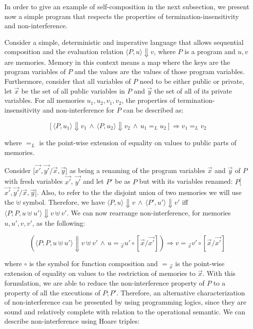 In order to give an example of self-composition in the next subsection, we present now a simple program that respects the properties of termination-insensitivity and non-interference.

Consider a simple, deterministic and imperative language that allows sequential composition and the evaluation relation \(\langle P, u\rangle \Downarrow v\), where \(P\) is a program and \(u,v\) are memories.
Memory in this context means a map where the keys are the program variables of \(P\) and the values are the values of those program variables.
Furthermore, consider that all variables of \(P\) need to be either public or private, let \(\overrightarrow{x}\) be the set of all public variables in \(P\) and \(\overrightarrow{y}\) the set of all of its private variables.
For all memories \(u_1,u_2,v_1,v_2\), the properties of termination-insensitivity and non-interference for \(P\) can be described as:

\[ [\langle P, u_1\rangle \Downarrow v_1 \, \land \, \langle P, u_2\rangle \Downarrow v_2 \, \land \, u_1 {=}_{L} u_2] \Rightarrow v_1 {=}_{L} v_2 \]

where ${=}_{L}$ is the point-wise extension of equality on values to public parts of memories.

Consider [\(\overrightarrow{x'}, \overrightarrow{y'} / \overrightarrow{x}, \overrightarrow{y}\)] as being a renaming of the program variables \(\overrightarrow{x}\) and \(\overrightarrow{y}\) of \(P\) with fresh variables \(\overrightarrow{x'}\), \(\overrightarrow{y'}\) and let \(P'\) be as \(P\) but with its variables renamed: \(P\)[\(\overrightarrow{x'}, \overrightarrow{y'} / \overrightarrow{x}, \overrightarrow{y}\)].
Also, to refer to the the disjoint union of two memories we will use the $\uplus$ symbol.
Therefore, we have \(\langle P, u\rangle \Downarrow v \, \land \, \langle P', u'\rangle \Downarrow v' \) iff \(\langle P; P, u \uplus u' \rangle \Downarrow v \uplus v'\).
We can now rearrange non-interference, for memories \(u,u',v,v'\), as the following:

\[ (\langle P; P, u \uplus u' \rangle \Downarrow v \uplus v' \, \land \, u = {}_{\overrightarrow{x}} u' \circ [\overrightarrow{x} / \overrightarrow{x'}]) \Rightarrow v = {}_{\overrightarrow{x}} v' \circ [\overrightarrow{x} / \overrightarrow{x'}] \]

where $\circ$ is the symbol for function composition and \(= {}_{\overrightarrow{x}}\) is the point-wise extension of equality on values to the restriction of memories to $\overrightarrow{x}$.
With this formulation, we are able to reduce the non-interference property of \(P\) to a property of all the executions of \(P; P'\).
Therefore, an alternative characterization of non-interference can be presented by using programming logics, since they are sound and relatively complete with relation to the operational semantic.
We can describe non-interference using Hoare triples:

